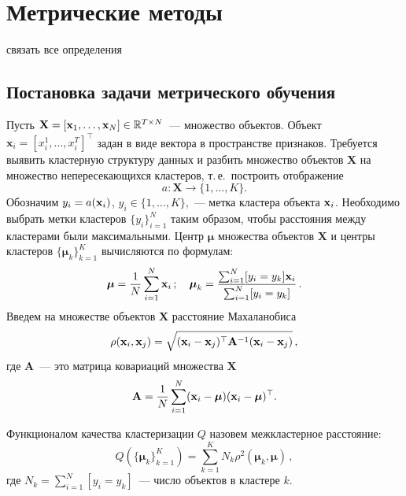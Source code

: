 \chapter{Метрические методы}

{\color{red} связать все определения}

\section{Постановка задачи метрического обучения}
Пусть $\mathbf{X} = [\mathbf{x}_1, \ldots, \mathbf{x}_N] \in \mathbb{R}^{T \times N}$~--- множество объектов.
Объект $\mathbf{x}_i = [x_i^1, \ldots, x_i^T]^\top$ задан в виде вектора в пространстве признаков.
Требуется выявить кластерную структуру данных и разбить множество объектов $\mathbf{X}$ на множество непересекающихся кластеров,
т.\,е.\ построить отображение
\[
a: \mathbf{X} \to \{1, \dots, K\}.
\]
Обозначим $y_i = a (\mathbf{x}_i)$, $y_i \in \{1, \ldots, K\}$,~--- метка кластера объекта $\mathbf{x}_i$.
Необходимо выбрать метки кластеров $\{y_i\}_{i=1}^N$ таким образом, чтобы расстояния между кластерами были максимальными.
Центр $\boldsymbol{\mu}$ множества объектов $\mathbf{X}$ и центры кластеров $\{\boldsymbol{\mu}_k\}_{k=1}^K$ вычисляются по формулам:
\begin{equation}
\label{mu}
\boldsymbol{\mu} =\frac1N \sum_{i=1}^N\mathbf{x}_i\,; \quad
\boldsymbol{\mu}_k =\frac{ \sum_{i=1}^N [y_i = y_k]\mathbf{x}_i } {\sum_{i=1}^N [y_i = y_k]}\,.
\end{equation}
Введем на множестве объектов $\mathbf{X}$ расстояние Махаланобиса
\begin{equation}
\label{metric}
\rho (\mathbf{x}_i, \mathbf{x}_j) = \sqrt{(\mathbf{x}_i - \mathbf{x}_j)^{\top} \mathbf{A}^{-1} (\mathbf{x}_i - \mathbf{x}_j)}\,,
\end{equation}
где $\mathbf{A}$~--- это матрица ковариаций множества $\mathbf{X}$
\begin{equation}
\label{covMatrix}
\mathbf{A} = \frac 1N \sum_{i=1}^N(\mathbf{x}_i - \boldsymbol{\mu})(\mathbf{x}_i - \boldsymbol{\mu})^{\top}.
\end{equation}
\begin{definition}
	Функционалом качества кластеризации $Q$ назовем межкластерное расстояние:
	\[
	Q (\{\boldsymbol{\mu}_k\}_{k=1}^K)= \sum_{k=1}^K N_k \rho^2(\boldsymbol{\mu}_k, \boldsymbol{\mu})\,,
	\]
	где $N_k = \sum_{i=1}^N [y_i = y_k]$~--- число объектов в кластере $k$.
\end{definition}


